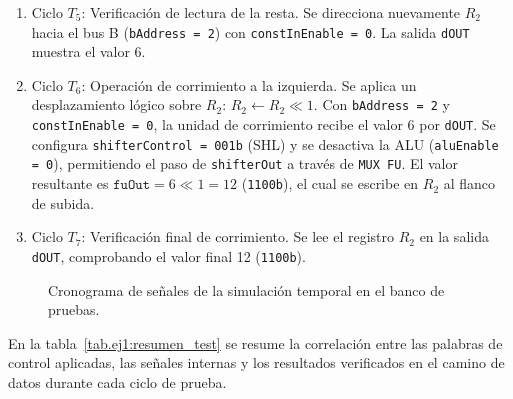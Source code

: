 \begin{enumerate}
    resultantes son \texttt{0001b}, encendiendo la bandera de acarreo ($C = 1$), lo cual certifica que no existió
    condición de préstamo negativo en la resta.
  \item Ciclo $T_5$: Verificación de lectura de la resta.  Se direcciona nuevamente $R_2$ hacia el bus B
    (\texttt{bAddress = 2}) con \texttt{constInEnable = 0}. La salida \texttt{dOUT} muestra el valor 6.
  \item Ciclo $T_6$: Operación de corrimiento a la izquierda.  Se aplica un desplazamiento lógico sobre $R_2$: $R_2
    \leftarrow R_2 \ll 1$. Con \texttt{bAddress = 2} y \texttt{constInEnable = 0}, la unidad de corrimiento recibe el
    valor 6 por \texttt{dOUT}. Se configura \texttt{shifterControl = 001b} (SHL) y se desactiva la ALU
    (\texttt{aluEnable = 0}), permitiendo el paso de \texttt{shifterOut} a través de \texttt{MUX FU}. El valor
    resultante es $\texttt{fuOut} = 6 \ll 1 = 12$ (\texttt{1100b}), el cual se escribe en $R_2$ al flanco de subida.
  \item Ciclo $T_7$: Verificación final de corrimiento.  Se lee el registro $R_2$ en la salida \texttt{dOUT},
    comprobando el valor final 12 (\texttt{1100b}).
\end{enumerate}

\begin{figure}[!ht]
  \centering
  \resizebox{\textwidth}{!}{}
  \caption{Cronograma de señales de la simulación temporal en el banco de pruebas.}
  \label{fig.ej1:simulacion}
\end{figure}

En la tabla~\ref{tab.ej1:resumen_test} se resume la correlación entre las palabras de control aplicadas, las señales
internas y los resultados verificados en el camino de datos durante cada ciclo de prueba.

